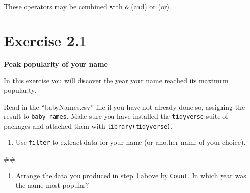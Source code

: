 \documentclass[]{book}
\newenvironment{Shaded}{\begin{snugshade}}{\end{snugshade}}
\newcommand{\KeywordTok}[1]{\textcolor[rgb]{0.13,0.29,0.53}{\textbf{#1}}}
\newcommand{\DecValTok}[1]{\textcolor[rgb]{0.00,0.00,0.81}{#1}}
\newcommand{\StringTok}[1]{\textcolor[rgb]{0.31,0.60,0.02}{#1}}
\newcommand{\CommentTok}[1]{\textcolor[rgb]{0.56,0.35,0.01}{\textit{#1}}}
\newcommand{\OperatorTok}[1]{\textcolor[rgb]{0.81,0.36,0.00}{\textbf{#1}}}
\newcommand{\NormalTok}[1]{#1}
\providecommand{\tightlist}{%
  \setlength{\itemsep}{0pt}\setlength{\parskip}{0pt}}
\begin{document}
These operators may be combined with \texttt{\&} (and) or
\texttt{\textbar{}} (or).

\begin{Shaded}
\end{Shaded}

\section{Exercise 2.1}\label{exercise-2.1}

\textbf{Peak popularity of your name}

In this exercise you will discover the year your name reached its
maximum popularity.

Read in the ``babyNames.csv'' file if you have not already done so,
assigning the result to \texttt{baby\_names}. Make sure you have
installed the \texttt{tidyverse} suite of packages and attached them
with \texttt{library(tidyverse)}.

\begin{enumerate}
\def\labelenumi{\arabic{enumi}.}
\tightlist
\item
  Use \texttt{filter} to extract data for your name (or another name of
  your choice).
\end{enumerate}

\begin{Shaded}
\begin{Highlighting}[]
\NormalTok{##}
\end{Highlighting}
\end{Shaded}

\begin{enumerate}
\def\labelenumi{\arabic{enumi}.}
\setcounter{enumi}{1}
\tightlist
\item
  Arrange the data you produced in step 1 above by \texttt{Count}. In
  which year was the name most popular?
\end{enumerate}
\end{document}
